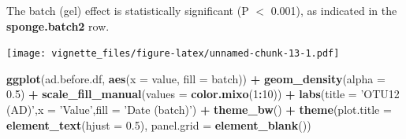 \documentclass[]{book}
\newenvironment{Shaded}{\begin{snugshade}}{\end{snugshade}}
\newcommand{\KeywordTok}[1]{\textcolor[rgb]{0.13,0.29,0.53}{\textbf{#1}}}
\newcommand{\DataTypeTok}[1]{\textcolor[rgb]{0.13,0.29,0.53}{#1}}
\newcommand{\DecValTok}[1]{\textcolor[rgb]{0.00,0.00,0.81}{#1}}
\newcommand{\FloatTok}[1]{\textcolor[rgb]{0.00,0.00,0.81}{#1}}
\newcommand{\StringTok}[1]{\textcolor[rgb]{0.31,0.60,0.02}{#1}}
\newcommand{\CommentTok}[1]{\textcolor[rgb]{0.56,0.35,0.01}{\textit{#1}}}
\newcommand{\OperatorTok}[1]{\textcolor[rgb]{0.81,0.36,0.00}{\textbf{#1}}}
\newcommand{\NormalTok}[1]{#1}
\begin{document}
The batch (gel) effect is statistically significant (P \(<\) 0.001), as
indicated in the \textbf{sponge.batch2} row.

\begin{Shaded}
\end{Shaded}

\texttt{[image: vignette\_files/figure-latex/unnamed-chunk-13-1.pdf]}

\begin{Shaded}
\begin{Highlighting}[]
\KeywordTok{ggplot}\NormalTok{(ad.before.df, }\KeywordTok{aes}\NormalTok{(}\DataTypeTok{x =}\NormalTok{ value, }\DataTypeTok{fill =}\NormalTok{ batch)) }\OperatorTok{+}\StringTok{ }
\StringTok{  }\KeywordTok{geom_density}\NormalTok{(}\DataTypeTok{alpha =} \FloatTok{0.5}\NormalTok{) }\OperatorTok{+}\StringTok{ }\KeywordTok{scale_fill_manual}\NormalTok{(}\DataTypeTok{values =} \KeywordTok{color.mixo}\NormalTok{(}\DecValTok{1}\OperatorTok{:}\DecValTok{10}\NormalTok{)) }\OperatorTok{+}\StringTok{ }
\StringTok{  }\KeywordTok{labs}\NormalTok{(}\DataTypeTok{title =} \StringTok{'OTU12 (AD)'}\NormalTok{,}\DataTypeTok{x =} \StringTok{'Value'}\NormalTok{,}\DataTypeTok{fill =} \StringTok{'Date (batch)'}\NormalTok{) }\OperatorTok{+}\StringTok{ }
\StringTok{  }\KeywordTok{theme_bw}\NormalTok{() }\OperatorTok{+}\StringTok{ }\KeywordTok{theme}\NormalTok{(}\DataTypeTok{plot.title =} \KeywordTok{element_text}\NormalTok{(}\DataTypeTok{hjust =} \FloatTok{0.5}\NormalTok{), }
                     \DataTypeTok{panel.grid =} \KeywordTok{element_blank}\NormalTok{())}
\end{Highlighting}
\end{Shaded}
\end{document}
